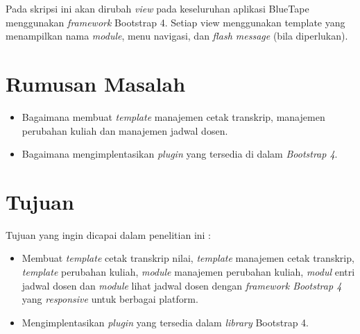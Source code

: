 \documentclass[a4paper,twoside]{article}
\begin{document}
%
%
%
Pada skripsi ini akan dirubah \textit{view} pada keseluruhan  aplikasi BlueTape menggunakan \textit{framework} Bootstrap 4. Setiap view menggunakan template yang menampilkan nama \textit{module}, menu navigasi, dan \textit{flash message} (bila diperlukan).



\section{Rumusan Masalah}

\begin{itemize}
	\item Bagaimana membuat \textit{template} manajemen cetak transkrip, manajemen perubahan kuliah dan manajemen jadwal dosen.
	\item Bagaimana mengimplentasikan \textit{plugin} yang tersedia di dalam \textit{Bootstrap 4}.
\end{itemize}

\section{Tujuan}
Tujuan yang ingin dicapai dalam penelitian ini :

	\begin{itemize}	
	\item Membuat \textit{template} cetak transkrip nilai, \textit{template} manajemen cetak transkrip, \textit{template} perubahan kuliah, \textit{module} manajemen perubahan kuliah, \textit{modul} entri jadwal dosen dan \textit{module} lihat jadwal dosen dengan \textit{framework Bootstrap 4} yang \textit{responsive} untuk berbagai platform.
	\item Mengimplentasikan \textit{plugin} yang tersedia dalam \textit{library} Bootstrap 4.
	
		
\end{itemize}
	
\end{document}
